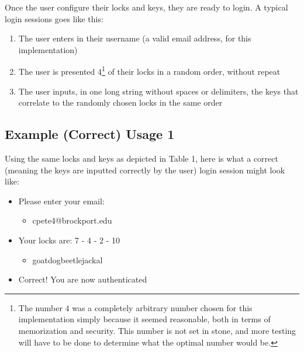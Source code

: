 \documentclass[conference]{IEEEtran}
\begin{document}
	Once the user configure their locks and keys, they are ready to login. A typical login sessions goes like this:
	\begin{enumerate}
		\item The user enters in their username (a valid email address, for this implementation)
		\item The user is presented 4\footnote{The number 4 was a completely arbitrary number chosen for this implementation simply because it seemed reasonable, both in terms of memorization and security. This number is not set in stone, and more testing will have to be done to determine what the optimal number would be.} of their locks in a random order, without repeat
		\item The user inputs, in one long string without spaces or delimiters, the keys that correlate to the randomly chosen locks in the same order
	\end{enumerate}
\subsection{Example (Correct) Usage 1}
	Using the same locks and keys as depicted in Table 1, here is what a correct (meaning the keys are inputted correctly by the user) login session might look like:
	\begin{itemize}
		\item Please enter your email:
		\begin{itemize}
			\item cpete4@brockport.edu
		\end{itemize}
		\item Your locks are: 7 - 4 - 2 - 10
		\begin{itemize}
			\item goatdogbeetlejackal
		\end{itemize}
		\item Correct! You are now authenticated
	\end{itemize}
\end{document}
